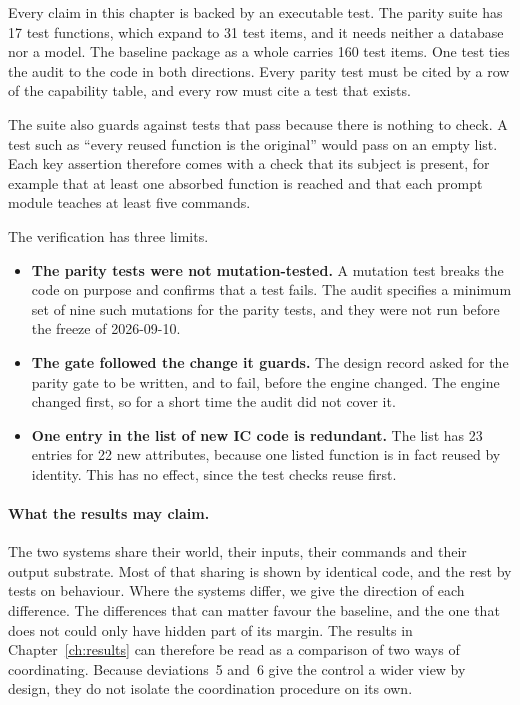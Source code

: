 Every claim in this chapter is backed by an executable test. The parity suite
has 17 test functions, which expand to 31 test items, and it needs neither a
database nor a model. The baseline package as a whole carries 160 test items.
One test ties the audit to the code in both directions. Every parity test must
be cited by a row of the capability table, and every row must cite a test that
exists.

The suite also guards against tests that pass because there is nothing to
check. A test such as ``every reused function is the original'' would pass on
an empty list. Each key assertion therefore comes with a check that its subject
is present, for example that at least one absorbed function is reached and that
each prompt module teaches at least five commands.

The verification has three limits.

\begin{itemize}
\item \textbf{The parity tests were not mutation-tested.} A mutation test breaks
  the code on purpose and confirms that a test fails. The audit specifies a
  minimum set of nine such mutations for the parity tests, and they were not
  run before the freeze of 2026-09-10.
\item \textbf{The gate followed the change it guards.} The design record asked
  for the parity gate to be written, and to fail, before the engine changed.
  The engine changed first, so for a short time the audit did not cover it.
\item \textbf{One entry in the list of new IC code is redundant.} The list has
  23 entries for 22 new attributes, because one listed function is in fact
  reused by identity. This has no effect, since the test checks reuse first.
\end{itemize}

\paragraph{What the results may claim.} The two systems share their world,
their inputs, their commands and their output substrate. Most of that sharing
is shown by identical code, and the rest by tests on behaviour. Where the
systems differ, we give the direction of each difference. The differences that
can matter favour the baseline, and the one that does not could only have
hidden part of its margin. The results in Chapter~\ref{ch:results} can
therefore be read as a comparison of two ways of coordinating. Because
deviations~5 and~6 give the control a wider view by design, they do not
isolate the coordination procedure on its own.
